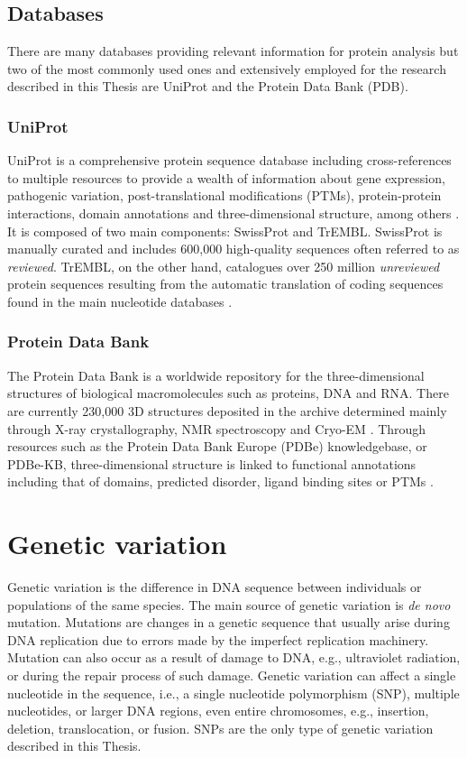 \subsection{Databases}

There are many databases providing relevant information for protein analysis but two of the most commonly used ones and extensively employed for the research described in this Thesis are UniProt and the Protein Data Bank (PDB).

\subsubsection{UniProt}

UniProt is a comprehensive protein sequence database including cross-references to multiple resources to provide a wealth of information about gene expression, pathogenic variation, post-translational modifications (PTMs), protein-protein interactions, domain annotations and three-dimensional structure, among others \cite{BAIROCH_2005_UNIPROT}. It is composed of two main components: SwissProt and TrEMBL. SwissProt is manually curated and includes 600,000 high-quality sequences often referred to as \textit{reviewed}. TrEMBL, on the other hand, catalogues over 250 million \textit{unreviewed} protein sequences resulting from the automatic translation of coding sequences found in the main nucleotide databases \cite{BAIROCH_2000_UNIPROT}.

\subsubsection{Protein Data Bank}

The Protein Data Bank is a worldwide repository for the three-dimensional structures of biological macromolecules such as proteins, DNA and RNA. There are currently 230,000 3D structures deposited in the archive determined mainly through X-ray crystallography, NMR spectroscopy and Cryo-EM \cite{BERMAN_2003_PDB}. Through resources such as the Protein Data Bank Europe (PDBe) knowledgebase, or PDBe-KB, three-dimensional structure is linked to functional annotations including that of domains, predicted disorder, ligand binding sites or PTMs \cite{PDBEKB_2019_PDBEKB}.

\section{Genetic variation}

Genetic variation is the difference in DNA sequence between individuals or populations of the same species. The main source of genetic variation is \textit{de novo} mutation. Mutations are changes in a genetic sequence that usually arise during DNA replication due to errors made by the imperfect replication machinery. Mutation can also occur as a result of damage to DNA, e.g., ultraviolet radiation, or during the repair process of such damage. Genetic variation can affect a single nucleotide in the sequence, i.e., a single nucleotide polymorphism (SNP), multiple nucleotides, or larger DNA regions, even entire chromosomes, e.g., insertion, deletion, translocation, or fusion. SNPs are the only type of genetic variation described in this Thesis.

